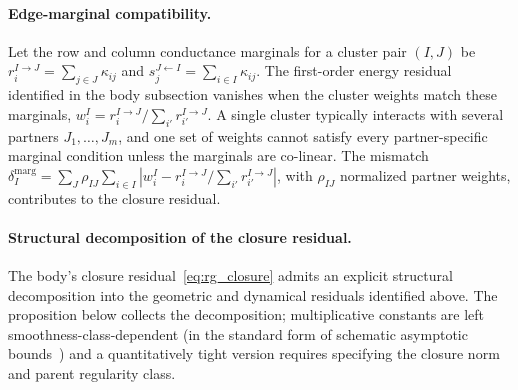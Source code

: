 \documentclass[11pt]{article}
\begin{document}
\paragraph{Edge-marginal compatibility.}
Let the row and column conductance marginals for a cluster pair $(I, J)$ be $r_i^{I \to J} = \sum_{j \in J}\kappa_{ij}$ and $s_j^{J \leftarrow I} = \sum_{i \in I}\kappa_{ij}$. The first-order energy residual identified in the body subsection vanishes when the cluster weights match these marginals, $w_i^I = r_i^{I \to J}/\sum_{i'}r_{i'}^{I \to J}$. A single cluster typically interacts with several partners $J_1, \ldots, J_m$, and one set of weights cannot satisfy every partner-specific marginal condition unless the marginals are co-linear. The mismatch $\delta_I^{\mathrm{marg}} = \sum_J \rho_{IJ}\sum_{i \in I}|w_i^I - r_i^{I \to J}/\sum_{i'}r_{i'}^{I \to J}|$, with $\rho_{IJ}$ normalized partner weights, contributes to the closure residual.

\paragraph{Structural decomposition of the closure residual.}
The body's closure residual~\eqref{eq:rg_closure} admits an explicit structural decomposition into the geometric and dynamical residuals identified above. The proposition below collects the decomposition; multiplicative constants are left smoothness-class-dependent (in the standard form of schematic asymptotic bounds~\cite{wong2001asymptotic}) and a quantitatively tight version requires specifying the closure norm and parent regularity class.
\end{document}
